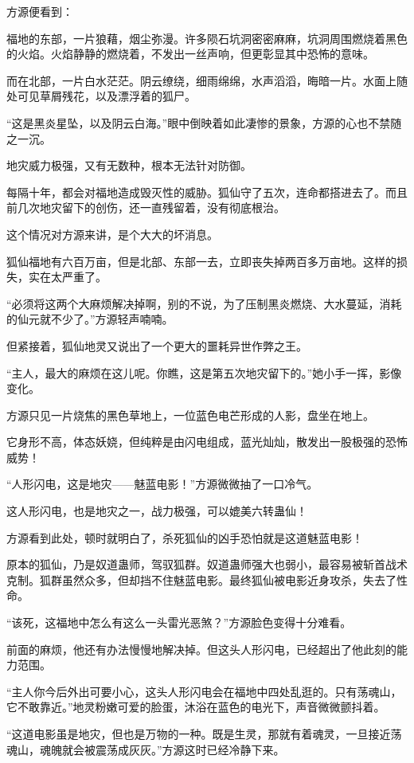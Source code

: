 \begin{this_body}
方源便看到：

福地的东部，一片狼藉，烟尘弥漫。许多陨石坑洞密密麻麻，坑洞周围燃烧着黑色的火焰。火焰静静的燃烧着，不发出一丝声响，但更彰显其中恐怖的意味。

而在北部，一片白水茫茫。阴云缭绕，细雨绵绵，水声滔滔，晦暗一片。水面上随处可见草屑残花，以及漂浮着的狐尸。

“这是黑炎星坠，以及阴云白海。”眼中倒映着如此凄惨的景象，方源的心也不禁随之一沉。

地灾威力极强，又有无数种，根本无法针对防御。

每隔十年，都会对福地造成毁灭性的威胁。狐仙守了五次，连命都搭进去了。而且前几次地灾留下的创伤，还一直残留着，没有彻底根治。

这个情况对方源来讲，是个大大的坏消息。

狐仙福地有六百万亩，但是北部、东部一去，立即丧失掉两百多万亩地。这样的损失，实在太严重了。

“必须将这两个大麻烦解决掉啊，别的不说，为了压制黑炎燃烧、大水蔓延，消耗的仙元就不少了。”方源轻声喃喃。

但紧接着，狐仙地灵又说出了一个更大的噩耗异世作弊之王。

“主人，最大的麻烦在这儿呢。你瞧，这是第五次地灾留下的。”她小手一挥，影像变化。

方源只见一片烧焦的黑色草地上，一位蓝色电芒形成的人影，盘坐在地上。

它身形不高，体态妖娆，但纯粹是由闪电组成，蓝光灿灿，散发出一股极强的恐怖威势！

“人形闪电，这是地灾——魅蓝电影！”方源微微抽了一口冷气。

这人形闪电，也是地灾之一，战力极强，可以媲美六转蛊仙！

方源看到此处，顿时就明白了，杀死狐仙的凶手恐怕就是这道魅蓝电影！

原本的狐仙，乃是奴道蛊师，驾驭狐群。奴道蛊师强大也弱小，最容易被斩首战术克制。狐群虽然众多，但却挡不住魅蓝电影。最终狐仙被电影近身攻杀，失去了性命。

“该死，这福地中怎么有这么一头雷光恶煞？”方源脸色变得十分难看。

前面的麻烦，他还有办法慢慢地解决掉。但这头人形闪电，已经超出了他此刻的能力范围。

“主人你今后外出可要小心，这头人形闪电会在福地中四处乱逛的。只有荡魂山，它不敢靠近。”地灵粉嫩可爱的脸蛋，沐浴在蓝色的电光下，声音微微颤抖着。

“这道电影虽是地灾，但也是万物的一种。既是生灵，那就有着魂灵，一旦接近荡魂山，魂魄就会被震荡成灰灰。”方源这时已经冷静下来。


\end{this_body}
